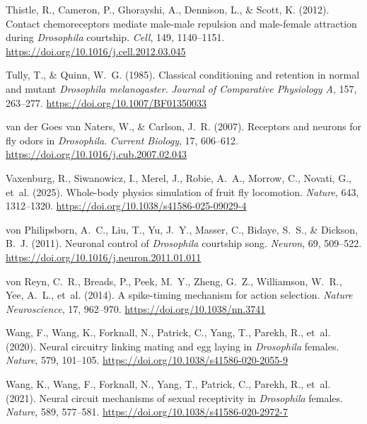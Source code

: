 Thistle, R., Cameron, P., Ghorayshi, A., Dennison, L., \& Scott, K. (2012). Contact chemoreceptors mediate male-male repulsion and male-female attraction during \emph{Drosophila} courtship. \emph{Cell}, 149, 1140--1151. \url{https://doi.org/10.1016/j.cell.2012.03.045}

Tully, T., \& Quinn, W.~G. (1985). Classical conditioning and retention in normal and mutant \emph{Drosophila melanogaster}. \emph{Journal of Comparative Physiology A}, 157, 263--277. \url{https://doi.org/10.1007/BF01350033}

van der Goes van Naters, W., \& Carlson, J.~R. (2007). Receptors and neurons for fly odors in \emph{Drosophila}. \emph{Current Biology}, 17, 606--612. \url{https://doi.org/10.1016/j.cub.2007.02.043}

Vaxenburg, R., Siwanowicz, I., Merel, J., Robie, A.~A., Morrow, C., Novati, G., et~al. (2025). Whole-body physics simulation of fruit fly locomotion. \emph{Nature}, 643, 1312--1320. \url{https://doi.org/10.1038/s41586-025-09029-4}

von Philipsborn, A.~C., Liu, T., Yu, J.~Y., Masser, C., Bidaye, S.~S., \& Dickson, B.~J. (2011). Neuronal control of \emph{Drosophila} courtship song. \emph{Neuron}, 69, 509--522. \url{https://doi.org/10.1016/j.neuron.2011.01.011}

von Reyn, C.~R., Breads, P., Peek, M.~Y., Zheng, G.~Z., Williamson, W.~R., Yee, A.~L., et~al. (2014). A spike-timing mechanism for action selection. \emph{Nature Neuroscience}, 17, 962--970. \url{https://doi.org/10.1038/nn.3741}

Wang, F., Wang, K., Forknall, N., Patrick, C., Yang, T., Parekh, R., et~al. (2020). Neural circuitry linking mating and egg laying in \emph{Drosophila} females. \emph{Nature}, 579, 101--105. \url{https://doi.org/10.1038/s41586-020-2055-9}

Wang, K., Wang, F., Forknall, N., Yang, T., Patrick, C., Parekh, R., et~al. (2021). Neural circuit mechanisms of sexual receptivity in \emph{Drosophila} females. \emph{Nature}, 589, 577--581. \url{https://doi.org/10.1038/s41586-020-2972-7}

